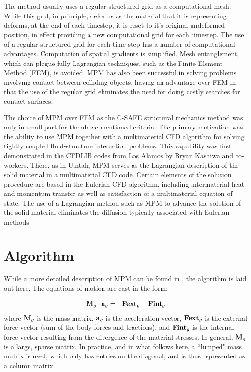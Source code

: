\documentclass[10pt]{article}
\newcommand{\tn}[1]{\mbox{\bf{#1}}}
\begin{document}
The method usually uses a regular structured grid as a 
computational mesh.
While this grid, in principle, deforms as the material that it 
is representing
deforms, at the end of each timestep, it is reset to it's 
original undeformed
position, in effect providing a new computational grid for each 
timestep.
The use of a regular structured grid for each time step has a 
number of
computational advantages.  Computation of spatial gradients is 
simplified.
Mesh entanglement, which can plague fully Lagrangian techniques, 
such as
the Finite Element Method (FEM), is avoided.  MPM has also been 
successful
in solving problems involving contact between colliding objects, 
having an
advantage over FEM in that the use of the regular grid 
eliminates the
need for doing costly searches for contact surfaces\cite{bard}.

The choice of MPM over FEM as the C-SAFE structural mechanics method
was only in small part for the above mentioned criteria.  The
primary motivation was the ability to use MPM together with a multimaterial
CFD algorithm for solving tightly coupled fluid-structure interaction
problems.  This capability was first demonstrated in the CFDLIB
codes from Los Alamos by Bryan Kashiwa and co-workers.  There, as
in Uintah, MPM serves as the Lagrangian description of the solid
material in a multimaterial CFD code.  Certain elements of the
solution procedure are based in the Eulerian CFD algorithm, including
intermaterial heat and momentum transfer as well as satisfaction
of a multimaterial equation of state.  The use of a Lagrangian method
such as MPM to advance the solution of the solid material eliminates
the diffusion typically associated with Eulerian methods.

\section{Algorithm}

While a more detailed description of MPM can be found in 
\cite{sulskycpc},
the algorithm is laid out here.  The equations of motion are 
cast in the
form:

\begin{eqnarray}
	\tn{M}_g \cdot \tn{a}_g &=& \tn{Fext}_g - \tn{Fint}_g  
\label{newton2}
\end{eqnarray}
where $\tn{M}_g$ is the mass matrix, $\tn{a}_g$ is the 
acceleration vector,
$\tn{Fext}_g$ is the external force vector (sum of the body 
forces and
tractions), and $\tn{Fint}_g$ is the internal force vector 
resulting from
the divergence of the material stresses.  In general, $\tn{M}_g$ 
is a 
large, sparse matrix.  In practice, and in what follows here, a 
``lumped"
mass matrix is used, which only has entries on the diagonal, and 
is thus
represented as a column matrix.
\end{document}
